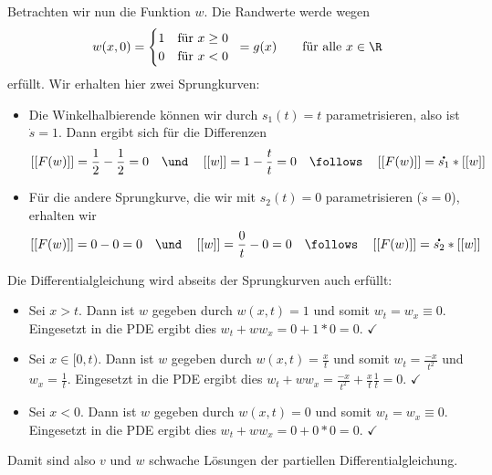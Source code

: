 \begin{exercisePage}
\begin{enumerate}[label=(zu \alph*), leftmargin=*]
	Betrachten wir nun die Funktion $w$. Die Randwerte werde wegen
	\begin{equation*}
		w(x,0) = \begin{cases} 1 &\text{für } x \geq 0 \\ 0 & \text{für } x < 0 \end{cases} \enskip = g(x) \qquad \text{für alle } x \in \R
	\end{equation*}
	erfüllt. Wir erhalten hier zwei Sprungkurven:
	\begin{itemize}
		\item Die Winkelhalbierende können wir durch $s_1(t) = t$ parametrisieren, also ist $\dot{s} = 1$. Dann ergibt sich für die Differenzen
		\begin{equation*}
			\dsq{F(w)} = \frac{1}{2} - \frac{1}{2} = 0  \quad \und \quad \dsq{w} = 1 - \frac{t}{t} = 0 \quad \follows \quad \dsq{F(w)} = \dot{s_1} * \dsq{w}
		\end{equation*}
		\item Für die andere Sprungkurve, die wir mit $s_2(t) = 0$ parametrisieren ($\dot{s} = 0$), erhalten wir 
		\begin{equation*}
		\dsq{F(w)} = 0 - 0 = 0  \quad \und \quad \dsq{w} = \frac{0}{t} - 0 = 0 \quad \follows \quad \dsq{F(w)} = \dot{s_2} * \dsq{w}
		\end{equation*}
	\end{itemize}
	Die Differentialgleichung wird abseits der Sprungkurven auch erfüllt:
	\begin{itemize}
		\item Sei $x > t$. Dann ist $w$ gegeben durch $w(x,t) = 1$ und somit $w_t = w_x \equiv 0$. Eingesetzt in die PDE ergibt dies $w_t + w w_x = 0 + 1 * 0 = 0$. $\checkmark$ 
		\item Sei $x \in [0,t)$. Dann ist $w$ gegeben durch $w(x,t) = \frac{x}{t}$ und somit $w_t = \frac{- x}{t^2}$ und $w_x = \frac{1}{t}$. Eingesetzt in die PDE ergibt dies $w_t + w w_x = \frac{- x}{t^2} + \frac{x}{t} \frac{1}{t} = 0$. $\checkmark$ 
		\item Sei $x < 0$. Dann ist $w$ gegeben durch $w(x,t) = 0$ und somit $w_t = w_x \equiv 0$. Eingesetzt in die PDE ergibt dies $w_t + w w_x = 0 + 0 * 0 = 0$. $\checkmark$ 
	\end{itemize}

	Damit sind also $v$ und $w$ schwache Lösungen der partiellen Differentialgleichung.
	

\end{enumerate}
\end{exercisePage}
